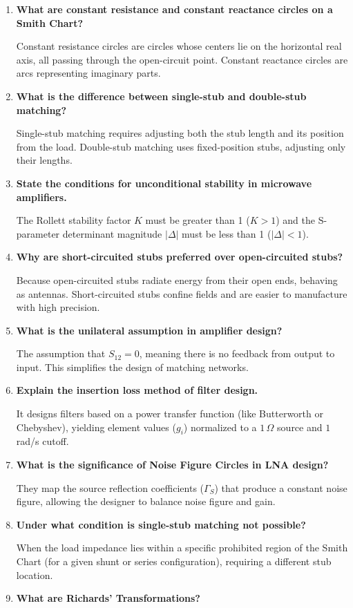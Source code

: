 \documentclass[12pt,a4paper]{article}
\newcommand{\Q}[1]{\textbf{#1}\par\noindent\ignorespaces}
\begin{document}
\begin{tcolorbox}[exambox, title={\textbf{Frequently Asked / Viva Questions}}]
\begin{enumerate}[topsep=0pt, label=\textbf{Q\arabic*.}, itemsep=5pt]
  \item \Q{What are constant resistance and constant reactance circles on a Smith Chart?}
    Constant resistance circles are circles whose centers lie on the horizontal real axis, all passing through the open-circuit point. Constant reactance circles are arcs representing imaginary parts.
  \item \Q{What is the difference between single-stub and double-stub matching?}
    Single-stub matching requires adjusting both the stub length and its position from the load. Double-stub matching uses fixed-position stubs, adjusting only their lengths.
  \item \Q{State the conditions for unconditional stability in microwave amplifiers.}
    The Rollett stability factor $K$ must be greater than 1 ($K > 1$) and the S-parameter determinant magnitude $|\Delta|$ must be less than 1 ($|\Delta| < 1$).
  \item \Q{Why are short-circuited stubs preferred over open-circuited stubs?}
    Because open-circuited stubs radiate energy from their open ends, behaving as antennas. Short-circuited stubs confine fields and are easier to manufacture with high precision.
  \item \Q{What is the unilateral assumption in amplifier design?}
    The assumption that $S_{12} = 0$, meaning there is no feedback from output to input. This simplifies the design of matching networks.
  \item \Q{Explain the insertion loss method of filter design.}
    It designs filters based on a power transfer function (like Butterworth or Chebyshev), yielding element values ($g_i$) normalized to a $1\,\Omega$ source and $1$ rad/s cutoff.
  \item \Q{What is the significance of Noise Figure Circles in LNA design?}
    They map the source reflection coefficients ($\Gamma_S$) that produce a constant noise figure, allowing the designer to balance noise figure and gain.
  \item \Q{Under what condition is single-stub matching not possible?}
    When the load impedance lies within a specific prohibited region of the Smith Chart (for a given shunt or series configuration), requiring a different stub location.
  \item \Q{What are Richards' Transformations?}

\end{enumerate}
\end{tcolorbox}
\end{document}
